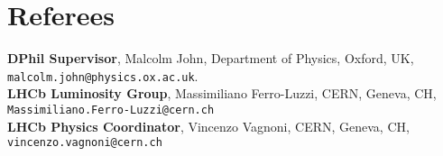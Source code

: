 \documentclass[11pt,a4paper]{article}
\begin{document}
\section*{Referees}

{\bf DPhil Supervisor}, Malcolm John, Department of Physics, Oxford, UK,\\ 
\texttt{malcolm.john@physics.ox.ac.uk}.\\[5pt]
{\bf LHCb Luminosity Group}, Massimiliano Ferro-Luzzi, CERN, Geneva, CH, \\
\texttt{Massimiliano.Ferro-Luzzi@cern.ch}\\[5pt]
{\bf LHCb Physics Coordinator}, Vincenzo Vagnoni, CERN, Geneva, CH, \\
\texttt{vincenzo.vagnoni@cern.ch}\\
\end{document}
